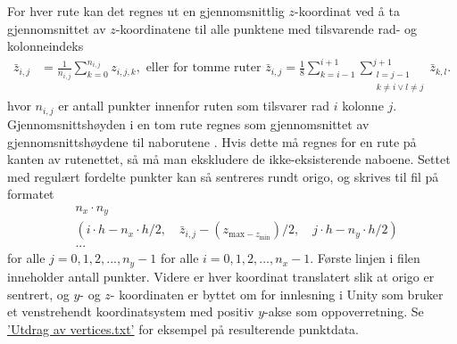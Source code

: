 \documentclass[norsk, doc, 11pt, a4paper]{apa7}  %
\begin{document}
For hver rute kan det regnes ut en gjennomsnittlig \(z\)-koordinat ved å ta gjennomsnittet av \(z\)-koordinatene til alle punktene med tilsvarende rad- og kolonneindeks
\begin{align*}
	\bar{z}_{i,j} &= \frac{1}{n_{i,j}}\sum_{k = 0}^{n_{i,j}}z_{i,j,k},\text{ eller for tomme ruter }
	\bar{z}_{i,j} = \frac{1}{8}\sum_{k=i-1}^{i+1}\sum_{\substack{l=j-1 \\ k\neq i \lor l\neq j}}^{j+1} \bar{z}_{k,l}.
\end{align*}
hvor \(n_{i,j}\) er antall punkter innenfor ruten som tilsvarer rad \(i\) kolonne \(j\). Gjennomsnittshøyden i en tom rute regnes som gjennomsnittet av gjennomsnittshøydene til naborutene \parencite[ss.140-141]{nylundMAT301MatematikkIII2023}.
Hvis dette må regnes for en rute på kanten av rutenettet, så må man ekskludere de ikke-eksisterende naboene.
Settet med regulært fordelte punkter kan så sentreres rundt origo, og skrives til fil på formatet
\begin{align*}
	&n_{x}\cdot n_{y} \\
	&(i\cdot h - n_{x}\cdot h/2,\quad \bar{z}_{i,j} - (z_{\text{max} - z_{\text{min}}})/2,\quad j\cdot h - n_{y}\cdot h/2) \\
	&...
\end{align*}
for alle \(j=0,1,2,...,n_{y}-1\) for alle \(i=0,1,2,...,n_{x}-1\). Første linjen i filen inneholder antall punkter. Videre er hver koordinat translatert slik at origo er sentrert, og \(y\)- og \(z\)- koordinaten er byttet om for innlesning i Unity \parencite{UnityEngine2023} som bruker et venstrehendt koordinatsystem med positiv \(y\)-akse som oppoverretning. Se \hyperref[ap:vert]{'Utdrag av vertices.txt'} for eksempel på resulterende punktdata.
\end{document}
